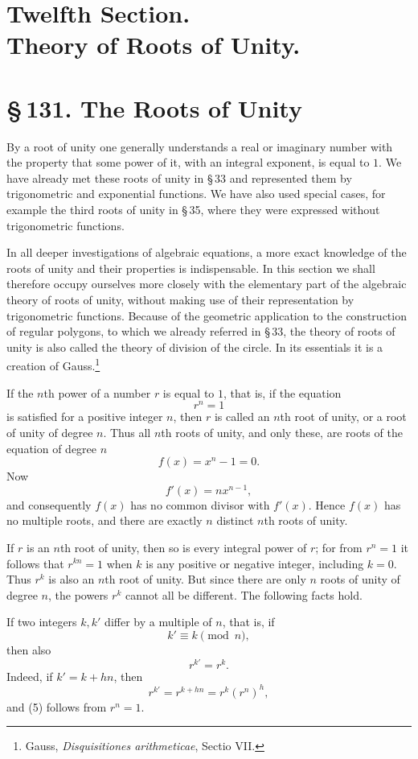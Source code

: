 \documentclass[11pt]{article}
\providecommand{\sect}[2]{\section*{\S\,#1. #2}}
\begin{document}
\section*{Twelfth Section.\\Theory of Roots of Unity.}

\sect{131}{The Roots of Unity}

By a root of unity one generally understands a real or imaginary number with the property that some power of it, with an integral exponent, is equal to $1$. We have already met these roots of unity in \S\,33 and represented them by trigonometric and exponential functions. We have also used special cases, for example the third roots of unity in \S\,35, where they were expressed without trigonometric functions.

In all deeper investigations of algebraic equations, a more exact knowledge of the roots of unity and their properties is indispensable. In this section we shall therefore occupy ourselves more closely with the elementary part of the algebraic theory of roots of unity, without making use of their representation by trigonometric functions. Because of the geometric application to the construction of regular polygons, to which we already referred in \S\,33, the theory of roots of unity is also called the theory of division of the circle. In its essentials it is a creation of Gauss.\footnote{Gauss, \emph{Disquisitiones arithmeticae}, Sectio VII.}

If the $n$th power of a number $r$ is equal to $1$, that is, if the equation
\[
\tag{1}        r^n=1
\]
is satisfied for a positive integer $n$, then $r$ is called an $n$th root of unity, or a root of unity of degree $n$. Thus all $n$th roots of unity, and only these, are roots of the equation of degree $n$
\[
\tag{2}        f(x)=x^n-1=0.
\]
Now
\[
\tag{3}        f'(x)=n x^{n-1},
\]
and consequently $f(x)$ has no common divisor with $f'(x)$. Hence $f(x)$ has no multiple roots, and there are exactly $n$ distinct $n$th roots of unity.

If $r$ is an $n$th root of unity, then so is every integral power of $r$; for from $r^n=1$ it follows that $r^{kn}=1$ when $k$ is any positive or negative integer, including $k=0$. Thus $r^k$ is also an $n$th root of unity. But since there are only $n$ roots of unity of degree $n$, the powers $r^k$ cannot all be different. The following facts hold.

If two integers $k,k'$ differ by a multiple of $n$, that is, if
\[
\tag{4}        k'\equiv k \pmod n,
\]
then also
\[
\tag{5}        r^{k'}=r^k.
\]
Indeed, if $k'=k+hn$, then
\[
        r^{k'}=r^{k+hn}=r^k(r^n)^h,
\]
and (5) follows from $r^n=1$.
\end{document}
